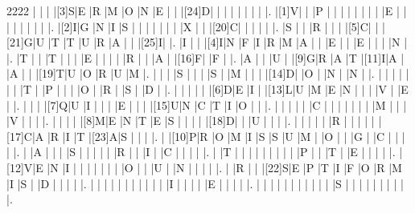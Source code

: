 \documentclass[12pt]{article}
\begin{document}
\begin{Puzzle}{22}{22}
  |{}  |{}  |{}  |[3]S|E   |R   |M   |O   |N   |E   |{}  |{}  |[24]D|{}  |{}  |{}  |{}  |{}  |{}  |{}  |{}  |.
  |[1]V|{}  |{}  |P   |{}  |{}  |{}  |{}  |{}  |{}  |{}  |{}  |E   |{}  |{}  |{}  |{}  |{}  |{}  |{}  |{}  |.
  |[2]I|G   |N   |I   |S   |{}  |{}  |{}  |{}  |{}  |{}  |{}  |X   |{}  |{}  |[20]C|{}  |{}  |{}  |{}  |{}  |.
  |S   |{}  |{}  |R   |{}  |{}  |{}  |[5]C|{}  |{}  |[21]G|U   |T   |T   |U   |R   |A   |{}  |{}  |[25]I|{}  |.
  |I   |{}  |{}  |[4]I|N   |F   |I   |R   |M   |A   |{}  |{}  |E   |{}  |{}  |E   |{}  |{}  |{}  |N   |{}  |.
  |T   |{}  |{}  |T   |{}  |{}  |{}  |E   |{}  |{}  |{}  |{}  |R   |{}  |{}  |A   |{}  |[16]F|{}  |F   |{}  |.
  |A   |{}  |{}  |U   |{}  |[9]G|R   |A   |T   |[11]I|A   |{}  |A   |{}  |{}  |[19]T|U   |O   |R   |U   |M   |.
  |{}  |{}  |{}  |S   |{}  |{}  |{}  |S   |{}  |M   |{}  |{}  |{}  |[14]D|{}  |O   |{}  |N   |{}  |N   |{}  |.
  |{}  |{}  |{}  |{}  |{}  |{}  |{}  |T   |{}  |P   |{}  |{}  |{}  |O   |{}  |R   |{}  |S   |{}  |D   |{}  |.
  |{}  |{}  |{}  |{}  |{}  |[6]D|E   |I   |{}  |[13]L|U   |M   |E   |N   |{}  |{}  |{}  |V   |{}  |E   |{}  |.
  |{}  |{}  |{}  |[7]Q|U   |I   |{}  |{}  |{}  |E   |{}  |{}  |{}  |[15]U|N   |C   |T   |I   |O   |{}  |{}  |.
  |{}  |{}  |{}  |{}  |{}  |C   |{}  |{}  |{}  |{}  |{}  |{}  |{}  |M   |{}  |{}  |{}  |V   |{}  |{}  |{}  |.
  |{}  |{}  |{}  |{}  |[8]M|E   |N   |T   |E   |S   |{}  |{}  |{}  |{}  |[18]D|{}  |{}  |U   |{}  |{}  |{}  |.
  |{}  |{}  |{}  |{}  |{}  |R   |{}  |{}  |{}  |{}  |{}  |[17]C|A   |R   |I   |T   |[23]A|S   |{}  |{}  |{}  |.
  |{}  |[10]P|R   |O   |M   |I   |S   |S   |U   |M   |{}  |O   |{}  |{}  |G   |{}  |C   |{}  |{}  |{}  |{}  |.
  |{}  |A   |{}  |{}  |{}  |S   |{}  |{}  |{}  |{}  |{}  |R   |{}  |{}  |I   |{}  |C   |{}  |{}  |{}  |{}  |.
  |{}  |T   |{}  |{}  |{}  |{}  |{}  |{}  |{}  |{}  |{}  |P   |{}  |{}  |T   |{}  |E   |{}  |{}  |{}  |{}  |.
  |[12]V|E   |N   |I   |{}  |{}  |{}  |{}  |{}  |{}  |{}  |O   |{}  |{}  |U   |{}  |N   |{}  |{}  |{}  |{}  |.
  |{}  |R   |{}  |{}  |[22]S|E   |P   |T   |I   |F   |O   |R   |M   |I   |S   |{}  |D   |{}  |{}  |{}  |{}  |.
  |{}  |{}  |{}  |{}  |{}  |{}  |{}  |{}  |{}  |{}  |{}  |I   |{}  |{}  |{}  |{}  |E   |{}  |{}  |{}  |{}  |.
  |{}  |{}  |{}  |{}  |{}  |{}  |{}  |{}  |{}  |{}  |{}  |S   |{}  |{}  |{}  |{}  |{}  |{}  |{}  |{}  |{}  |.
\end{Puzzle}
\end{document}

